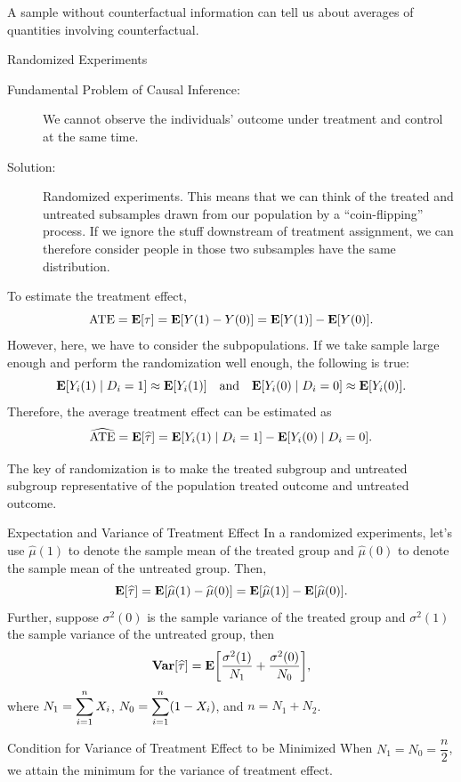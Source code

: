 \begin{rmk}
	A sample without counterfactual information can tell us about averages of quantities involving counterfactual. 	
\end{rmk}
\begin{thm}{Randomized Experiments}
	\begin{description}
		\item[Fundamental Problem of Causal Inference:]	We cannot observe the individuals' outcome under treatment and control at the same time.
		\item[Solution:] Randomized experiments. This means that we can think of the treated and untreated subsamples drawn from our population by a ``coin-flipping'' process. If we ignore the stuff downstream of treatment assignment, we can therefore consider people in those two subsamples have the same distribution. 
	\end{description}
To estimate the treatment effect, \[\mathrm{ATE}=\vb{E}\qty[\tau]=\vb{E}\qty[Y(1)-Y(0)]=\vb{E}\qty[Y(1)]-\vb{E}\qty[Y(0)].\] However, here, we have to consider the subpopulations. If we take sample large enough and perform the randomization well enough, the following is true: \[\vb{E}\qty[Y_i(1)\mid D_i=1]\approx\vb{E}\qty[Y_i(1)]\quad\text{and}\quad\vb{E}\qty[Y_i(0)\mid D_i=0]\approx\vb{E}\qty[Y_i(0)].\] Therefore, the average treatment effect can be estimated as \[\widehat{\mathrm{ATE}}=\vb{E}\qty[\widehat\tau]=\vb{E}\qty[Y_i(1)\mid D_i=1]-\vb{E}\qty[Y_i(0)\mid D_i=0].\]
\end{thm}
\begin{rmk}
	The key of randomization is to make the treated subgroup and untreated subgroup representative of the population treated outcome and untreated outcome.
\end{rmk}
\begin{thm}{Expectation and Variance of Treatment Effect}
	In a randomized experiments, let's use $\hat\mu(1)$	to denote the sample mean of the treated group and $\hat\mu(0)$ to denote the sample mean of the untreated group. Then, \[\vb{E}\qty[\widehat\tau]=\vb{E}\qty[\widehat\mu(1)-\widehat\mu(0)]=\vb{E}\qty[\widehat\mu(1)]-\vb{E}\qty[\widehat\mu(0)].\]
	Further, suppose $\sigma^2(0)$ is the sample variance of the treated group and $\sigma^2(1)$ the sample variance of the untreated group, then \[\vb{Var}\qty[\widehat\tau]=\vb{E}\qty[\dfrac{\sigma^2(1)}{N_1}+\dfrac{\sigma^2(0)}{N_0}],\] where $N_1=\displaystyle\sum_{i=1}^n X_i$, $N_0=\displaystyle\sum_{i=1}^n(1-X_i)$, and $n=N_1+N_2$.
\end{thm}
\begin{thm}{Condition for Variance of Treatment Effect to be Minimized}
	When $N_1=N_0=\dfrac{n}{2}$, we attain the minimum for the variance of treatment effect. 	
\end{thm}


